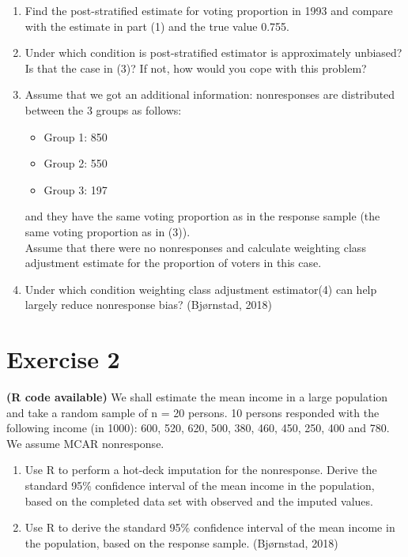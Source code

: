 \documentclass[12pt]{article}
\begin{document}
\begin{enumerate}
\item Find the post-stratified estimate for voting proportion in 1993 and compare with the estimate in part (1) and the true value 0.755.
\item Under which condition is post-stratified estimator is approximately unbiased? Is that the case in (3)? If not, how would you cope with this problem?
\item Assume that we got an additional information: nonresponses are distributed between the 3 groups as follows:  
\begin{itemize}
\item Group 1: 850
\item Group 2: 550
\item Group 3: 197
\end{itemize}
and they have the same voting proportion as in the response sample (the same voting proportion as in (3)).\\
Assume that there were no nonresponses and calculate weighting class adjustment estimate for the proportion of voters in this case.
\item Under which condition weighting class adjustment estimator(4) can help largely reduce nonresponse bias? \hfill(Bjørnstad, 2018)
\end{enumerate}

\section*{Exercise 2}
\textbf{\color{ForestGreen}(R code available)} We shall estimate the mean income in a large population and take a random sample of n = 20 persons. 10 persons responded with the following income (in 1000): 600, 520, 620, 500, 380, 460, 450, 250, 400 and 780. We assume MCAR nonresponse. 
\begin{enumerate}
\item Use R to perform a hot-deck imputation for the nonresponse. Derive the standard 95\% confidence interval of the mean income in the population, based on the completed data set with observed and the imputed values.
\item Use R to derive the standard 95\% confidence interval of the mean income in the population, based on the response sample. \hfill(Bjørnstad, 2018)
\end{enumerate}
\end{document}
